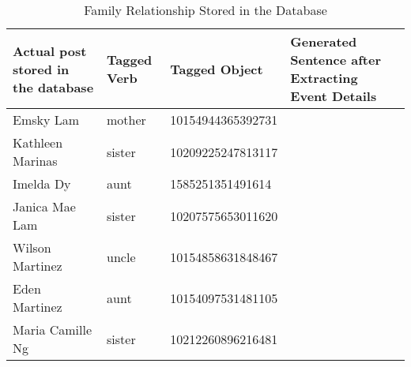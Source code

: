 \begin{table}[ph!]   %
	\centering
	\caption{Family Relationship Stored in the Database} \vspace{0.25em}
	\begin{tabular}{|p{2in}|p{1in}|p{1in}|p{2in}|} \hline
		\centering Actual post stored in the database & Tagged Verb & Tagged Object & Generated Sentence after Extracting Event Details \\ \hline
		Emsky Lam & mother & 10154944365392731 \\ \hline
		Kathleen Marinas & sister & 10209225247813117 \\ \hline
		Imelda Dy & aunt & 1585251351491614 \\ \hline
		Janica Mae Lam & sister & 10207575653011620 \\ \hline
		Wilson Martinez & uncle & 10154858631848467 \\ \hline
		Eden Martinez & aunt & 10154097531481105 \\ \hline
		Maria Camille Ng & sister & 10212260896216481 \\ \hline
	\end{tabular}
	\label{tab:wrong-extraction}
\end{table}
